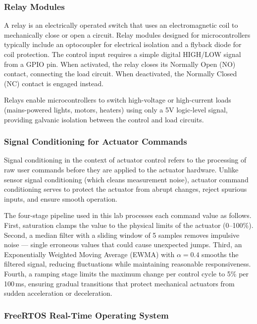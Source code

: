 \subsubsection{Relay Modules}

A relay is an electrically operated switch that uses an electromagnetic coil to mechanically close or open a circuit. Relay modules designed for microcontrollers typically include an optocoupler for electrical isolation and a flyback diode for coil protection. The control input requires a simple digital HIGH/LOW signal from a GPIO pin. When activated, the relay closes its Normally Open (NO) contact, connecting the load circuit. When deactivated, the Normally Closed (NC) contact is engaged instead.

Relays enable microcontrollers to switch high-voltage or high-current loads (mains-powered lights, motors, heaters) using only a 5V logic-level signal, providing galvanic isolation between the control and load circuits.

\subsubsection{Signal Conditioning for Actuator Commands}

Signal conditioning in the context of actuator control refers to the processing of raw user commands before they are applied to the actuator hardware. Unlike sensor signal conditioning (which cleans measurement noise), actuator command conditioning serves to protect the actuator from abrupt changes, reject spurious inputs, and ensure smooth operation.

The four-stage pipeline used in this lab processes each command value as follows. First, saturation clamps the value to the physical limits of the actuator (0--100\%). Second, a median filter with a sliding window of 5 samples removes impulsive noise --- single erroneous values that could cause unexpected jumps. Third, an Exponentially Weighted Moving Average (EWMA) with $\alpha = 0.4$ smooths the filtered signal, reducing fluctuations while maintaining reasonable responsiveness. Fourth, a ramping stage limits the maximum change per control cycle to 5\% per 100\,ms, ensuring gradual transitions that protect mechanical actuators from sudden acceleration or deceleration.

\subsubsection{FreeRTOS Real-Time Operating System}

